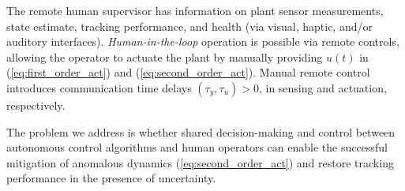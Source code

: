 \documentclass[english]{ifacconf}
\begin{document}
The remote human supervisor has information on plant sensor measurements, state estimate, tracking performance, and health (via visual, haptic, and/or auditory interfaces). \textit{Human-in-the-loop} operation is possible via remote controls, allowing the operator to actuate the plant by manually providing $u(t)$ in (\ref{eq:first_order_act}) and (\ref{eq:second_order_act}). Manual remote control introduces communication time delays $(\tau_y, \tau_u) > 0$, in sensing and actuation, respectively.

The problem we address is whether shared decision-making and control between autonomous control algorithms and human operators can enable the successful mitigation of anomalous dynamics (\ref{eq:second_order_act}) and restore tracking performance in the presence of uncertainty.


\end{document}
